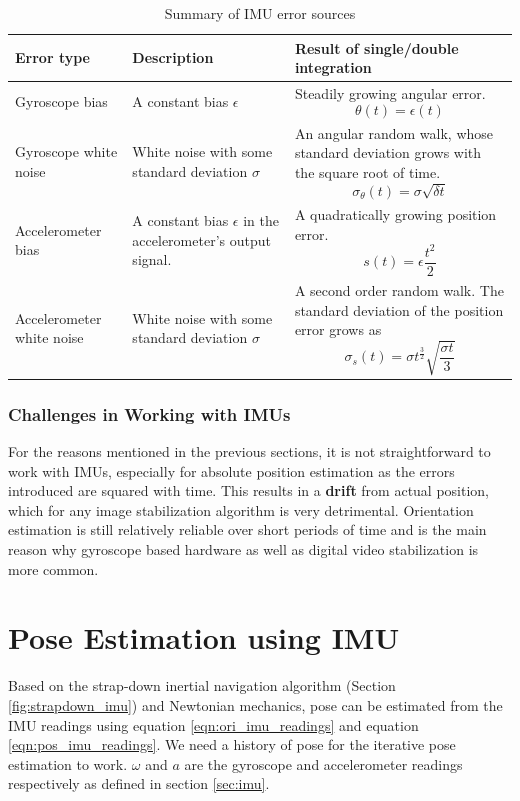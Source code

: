 \begin{table}[H]
\centering
\begin{tabular}{| l| L| L |}
     \hline
     \textbf{Error type} & \textbf{Description} & \textbf{Result of single/double integration} \\ 
     \hline
     Gyroscope bias & 
     A constant bias $ \epsilon $ & 
     Steadily growing angular error.  \[\theta(t) = \epsilon(t)\] \\
     \hline
     Gyroscope white noise & 
     White noise with some standard deviation $ \sigma $ & 
     An angular random walk, whose standard deviation grows with the square root of time. 
     \[\sigma_\theta(t) = \sigma \sqrt{\delta t}\] \\
     
     \hline
     Accelerometer bias & 
     A constant bias $ \epsilon $ in the accelerometer's output signal. & 
     A quadratically growing position error. \[s(t) = \epsilon  \frac{t^{2}}{2}\]   \\
     \hline
     Accelerometer white noise & 
     White noise with some standard deviation $ \sigma $ & 
     A second order random walk. The standard deviation of the position error grows as
     \[\sigma_s(t) = \sigma  t^{\frac{3}{2}}  \sqrt{\frac{\sigma  t}{3}}\]   \\

     \hline
     
\end{tabular}
    \caption{Summary of IMU error sources \citep{woodman2007introduction}}
    \label{tab:imu_error_char}
\end{table}

\subsubsection{Challenges in Working with IMUs}
For the reasons mentioned in the previous sections, it is not straightforward to work with IMUs, especially for absolute position estimation as the errors introduced are squared with time. This results in a \textbf{drift} from actual position, which for any image stabilization algorithm is very detrimental. Orientation estimation is still relatively reliable over short periods of time and is the main reason why gyroscope based hardware as well as digital video stabilization is more common.

\section{Pose Estimation using IMU}
\label{sec:pose_estimation_imu}
Based on the strap-down inertial navigation algorithm (Section \ref{fig:strapdown_imu}) and Newtonian mechanics, pose can be estimated from the IMU readings using equation \ref{eqn:ori_imu_readings} and equation \ref{eqn:pos_imu_readings}. We need a history of pose for the iterative pose estimation to work. $ \omega $ and $ a $ are the gyroscope and accelerometer readings respectively as defined in section \ref{sec:imu}.

